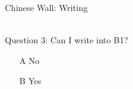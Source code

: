 \documentclass{beamer}
\begin{document}
\begin{frame}{Chinese Wall: Writing}
  \begin{center}
\\[20pt]Question 3: Can I write into B1?
\begin{itemize}
  \item [A] No
  \item [B] Yes
\end{itemize}
  \end{center}
\end{frame}
\end{document}
